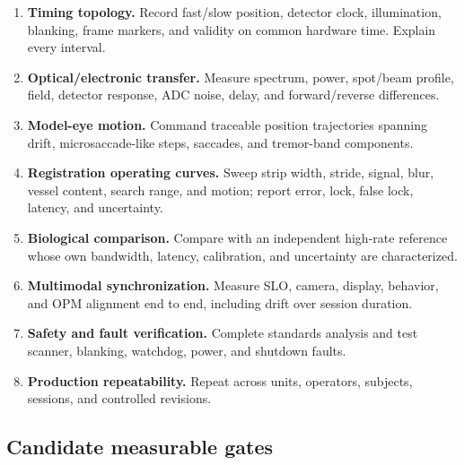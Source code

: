 \documentclass[11pt]{article}
\begin{document}
\begin{enumerate}
  \item \textbf{Timing topology.} Record fast/slow position, detector clock, illumination, blanking,
  frame markers, and validity on common hardware time. Explain every interval.
  \item \textbf{Optical/electronic transfer.} Measure spectrum, power, spot/beam profile, field,
  detector response, ADC noise, delay, and forward/reverse differences.
  \item \textbf{Model-eye motion.} Command traceable position trajectories spanning drift,
  microsaccade-like steps, saccades, and tremor-band components.
  \item \textbf{Registration operating curves.} Sweep strip width, stride, signal, blur, vessel
  content, search range, and motion; report error, lock, false lock, latency, and uncertainty.
  \item \textbf{Biological comparison.} Compare with an independent high-rate reference whose own
  bandwidth, latency, calibration, and uncertainty are characterized.
  \item \textbf{Multimodal synchronization.} Measure SLO, camera, display, behavior, and OPM
  alignment end to end, including drift over session duration.
  \item \textbf{Safety and fault verification.} Complete standards analysis and test scanner,
  blanking, watchdog, power, and shutdown faults.
  \item \textbf{Production repeatability.} Repeat across units, operators, subjects, sessions, and
  controlled revisions.
\end{enumerate}

\subsection{Candidate measurable gates}
\end{document}
